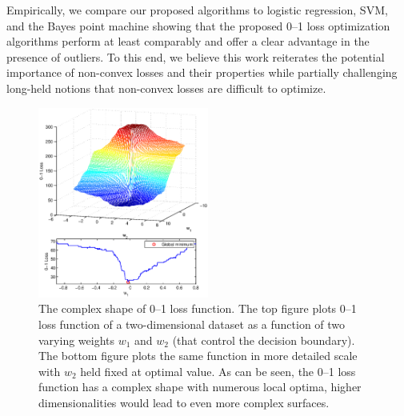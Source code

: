 Empirically, we compare our proposed algorithms to logistic
regression, SVM, and the Bayes point machine showing that the proposed
0--1 loss optimization algorithms perform at least comparably and
offer a clear advantage in the presence of outliers.  To this end, we
believe this work reiterates the potential importance of non-convex
losses and their properties while partially challenging long-held
notions that non-convex losses are difficult to optimize.

\begin{figure}[t!]
\includegraphics[width=0.50\textwidth]{images/fig14_complexshape.eps}
\caption{ \footnotesize The complex shape of 0--1 loss function.  The
  top figure plots 0--1 loss function of a two-dimensional dataset as
  a function of two varying weights $w_1$ and $w_2$ (that control the
  decision boundary). The bottom figure plots the same function in
  more detailed scale with $w_2$ held fixed at optimal value. As can
  be seen, the 0--1 loss function has a complex shape with numerous
  local optima, higher dimensionalities would lead to even more
  complex surfaces.  }
\label{fig:complex_shape}
\end{figure}

